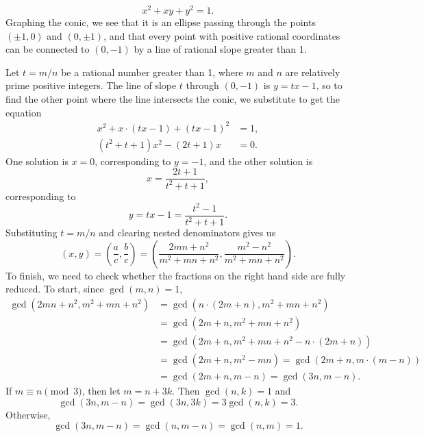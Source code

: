 \begin{enumerate}
\begin{equation*}
x^2 + xy + y^2 = 1.
\end{equation*}
Graphing the conic, we see that it is an ellipse passing through the points $(\pm 1, 0)$ and $(0, \pm 1)$, and that every point with positive rational coordinates can be connected to $(0,-1)$ by a line of rational slope greater than 1.\par
Let $t = m/n$ be a rational number greater than 1, where $m$ and $n$ are relatively prime positive integers. The line of slope $t$ through $(0,-1)$ is $y = tx - 1$, so to find the other point where the line intersects the conic, we substitute to get the equation
\begin{align*}
x^2 + x\cdot (tx - 1) + (tx - 1)^2 &= 1, \\
(t^2 + t + 1)x^2 - (2t + 1)x &= 0.
\end{align*}
One solution is $x = 0$, corresponding to $y = -1$, and the other solution is
\begin{equation*}
x = \frac{2t + 1}{t^2 + t + 1},
\end{equation*}
corresponding to
\begin{equation*}
y = tx - 1 = \frac{t^2 - 1}{t^2 + t + 1}.
\end{equation*}
Substituting $t = m/n$ and clearing nested denominators gives us
\begin{equation*}
(x,y) = \left(\frac{a}{c},\frac{b}{c}\right) = \left(\frac{2mn + n^2}{m^2 + mn + n^2}, \frac{m^2 - n^2}{m^2 + mn + n^2}\right).
\end{equation*}
To finish, we need to check whether the fractions on the right hand side are fully reduced. To start, since $\gcd(m,n) = 1$,
\begin{align*}
\gcd(2mn + n^2, m^2 + mn + n^2) &= \gcd(n\cdot (2m + n), m^2 + mn + n^2) \\
&= \gcd(2m + n, m^2 + mn + n^2) \\
&= \gcd(2m + n, m^2 + mn + n^2 - n\cdot (2m + n)) \\
&= \gcd(2m + n, m^2 - mn) = \gcd(2m + n, m\cdot (m - n)) \\
&= \gcd(2m + n, m - n) = \gcd(3n, m - n).
\end{align*}
If $m\equiv n\pmod{3}$, then let $m = n + 3k$. Then $\gcd(n,k) = 1$ and
\begin{equation*}
\gcd(3n, m - n) = \gcd(3n,3k) = 3\gcd(n,k) = 3.
\end{equation*}
Otherwise,
\begin{equation*}
\gcd(3n, m - n) = \gcd(n, m - n) = \gcd(n,m) = 1.

\end{equation*}
\end{enumerate}
